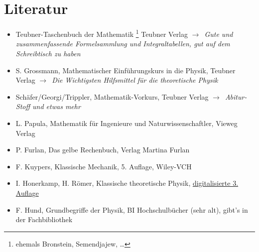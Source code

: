 \documentclass[oneside]{book}
\theoremstyle{definition}
\newcommand{\conseq}{$\rightarrow$~}
\begin{document}
\section{Literatur}

\begin{itemize}
	\item Teubner-Taschenbuch der Mathematik \footnote{ehemals Bronstein, Semendjajew, \dots} Teubner Verlag \conseq \textit{Gute und zusammenfassende Formelsammlung und Integraltabellen, gut auf dem Schreibtisch zu haben}
	\item S. Grossmann, Mathematischer Einführungskurs in die Physik, Teubner Verlag \conseq \textit{Die Wichtigsten Hilfsmittel für die theoretische Physik}
	\item Schäfer/Georgi/Trippler, Mathematik-Vorkurs, Teubner Verlag \conseq \textit{Abitur-Stoff und etwas mehr}
	\item L. Papula, Mathematik für Ingenieure und Naturwissenschaftler, Vieweg Verlag
	\item P. Furlan, Das gelbe Rechenbuch, Verlag Martina Furlan
	\item F. Kuypers, Klassische Mechanik, 5. Auflage, Wiley-VCH
	\item I. Honerkamp, H. Römer, Klassische theoretische Physik, \href{http://www.freidok.uni-freiburg.de/volltexte/82/}{digitalisierte 3. Auflage}
	\item F. Hund, Grundbegriffe der Physik, BI Hochschulbücher (sehr alt), gibt's in der Fachbibliothek
\end{itemize}
\end{document}
